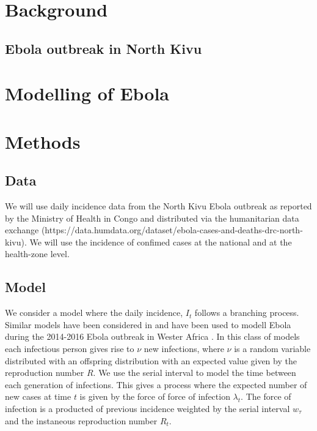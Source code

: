 \documentclass[12pt]{article}
\begin{document}
\section{Background}
\subsection{Ebola outbreak in North Kivu}




\section{Modelling of Ebola}




\section{Methods}

\subsection{Data}
We will use daily incidence data from the North Kivu Ebola outbreak as reported by the Ministry of Health in Congo and distributed via the humanitarian data exchange (https://data.humdata.org/dataset/ebola-cases-and-deaths-drc-north-kivu). We will use the incidence of confimed cases at the national and at the health-zone level.

\subsection{Model}

We consider a model where the daily incidence, $I_t$ follows a branching process. Similar models have been considered in \cite{coriNewFrameworkSoftware2013,lloyd-smithSuperspreadingEffectIndividual2005} and have been used to modell Ebola during the 2014-2016 Ebola outbreak in Wester Africa \cite{EbolaVirusDisease2014, internationalebolaresponseteamExposurePatternsDriving2016}. In this class of models each infectious person gives rise to $\nu$ new infections, where $\nu$ is a random variable distributed with an offspring distribution with an expected value given by the reproduction number $R$. We use the serial interval to model the time between each generation of infections. This gives a process where the expected number of new cases at time $t$ is given by the force of force of infection $\lambda_t$. The force of infection is a producted of previous incidence weighted by the serial interval $w_\tau$ and the instaneous reproduction number $R_t$. 
\end{document}
